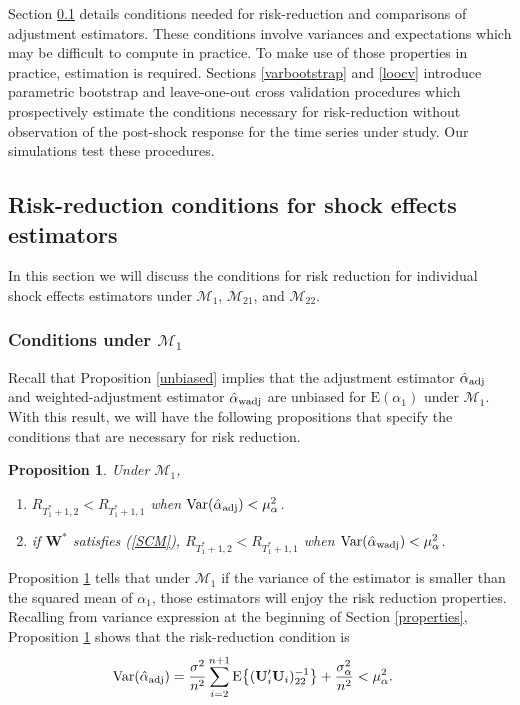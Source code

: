 \documentclass[11pt]{article}
\def\mbf#1{\mathbf{#1}} %
\def\mrm#1{\mathrm{#1}} %
\def\mc#1{\mathcal{#1}} %
\def\E#1{\mathrm{E}(#1)} %
\def\var#1{\mathrm{Var}(#1)} %
\DeclareMathOperator{\Var}{Var} %
\newtheorem{prop}{Proposition}
\theoremstyle{definition}
\begin{document}
Section \ref{conditions} details conditions needed for risk-reduction and comparisons of adjustment estimators. These conditions involve variances and expectations which may be difficult to compute in practice. To make use of those properties in practice, estimation is required. Sections \ref{varbootstrap} and \ref{loocv} introduce  parametric bootstrap and leave-one-out cross validation procedures which prospectively estimate the conditions necessary for risk-reduction without observation of the post-shock response for the time series under study. Our simulations test these procedures. 


\subsection{Risk-reduction conditions for shock effects estimators}
\label{conditions}

In this section we will discuss the conditions for risk reduction for individual shock effects estimators under $\mc{M}_1$, $\mc{M}_{21}$, and $\mc{M}_{22}$. %

\subsubsection{Conditions under $\mc{M}_1$}
 \label{conditionsmodel1}
 
Recall that Proposition \ref{unbiased} implies that the adjustment estimator $\hat{\alpha}_{\rm adj}$ and weighted-adjustment estimator $\hat{\alpha}_{\rm wadj}$ are unbiased for $\E{\alpha_1}$ under $\mc{M}_1$. With this result, we will have  the following propositions that specify the conditions that are necessary for risk reduction. 

\begin{prop}
\label{proprisk}Under $\mc{M}_1$,
\begin{enumerate}[label = (\roman*)]
  \item  $R_{T_1^*+1, 2} < R_{T_1^*+1, 1}$ when 
$\Var(\hat{\alpha}_{\rm adj}) < \mu_{\alpha}^2$.
  \item if $\mbf{W}^*$ satisfies (\ref{SCM}), $R_{T_1^*+1,2}<R_{T_1^*+1,1}$ when $\var{\hat{\alpha}_{\rm wadj}}<\mu_{\alpha}^2$. 
\end{enumerate}
\end{prop}

Proposition \ref{proprisk} tells that under $\mc{M}_1$ if the variance of the estimator is smaller than the squared mean of $\alpha_1$, those estimators will enjoy the risk reduction properties. Recalling from variance expression at the beginning of Section \ref{properties}, Proposition \ref{proprisk} shows that the risk-reduction condition is
\begin{align}
  \var{\hat{\alpha}_{\rm adj}} 
  &=\frac{\sigma^2}{n^2}\sum_{i=2}^{n+1}\mrm{E}\big\{(\mbf{U}'_i\mbf{U}_i)^{-1}_{22}\big\}+\frac{\sigma^2_{\alpha}}{n^2} < \mu_{\alpha}^2. \label{riskconditionadj}
\end{align}
\end{document}
